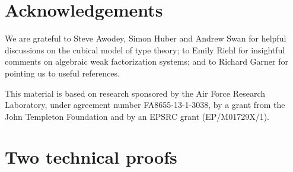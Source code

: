 \documentclass[reqno,10pt,a4paper,oneside,draft]{amsart}
\begin{document}
\begin{theorem}
\section*{Acknowledgements}

We are grateful to Steve Awodey, Simon Huber and Andrew Swan for helpful discussions on the cubical model of type theory; to Emily Riehl for insightful comments on algebraic weak factorization systems; and to Richard Garner for pointing us to useful references.

This material is based on research sponsored by the Air Force Research Laboratory, under agreement number FA8655-13-1-3038, by a grant from the John Templeton Foundation and by an EPSRC grant (EP/M01729X/1).


\appendix

\section{Two technical proofs}
\label{app:tecp}


\end{theorem}
\end{document}
